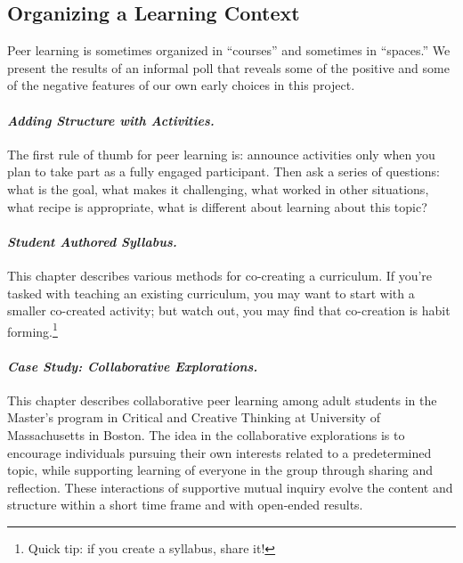 \hypertarget{organizing-a-learning-context}{%
\subsection{Organizing a Learning
Context}\label{organizing-a-learning-context}}

Peer learning is sometimes organized in ``courses'' and sometimes in
``spaces.'' We present the results of an informal poll that reveals some
of the positive and some of the negative features of our own early
choices in this project.

\hypertarget{adding-structure-with-activities.}{%
\paragraph{\texorpdfstring{\emph{Adding Structure with
Activities.}}{Adding Structure with Activities.}}\label{adding-structure-with-activities.}}

The first rule of thumb for peer learning is: announce activities only
when you plan to take part as a fully engaged participant. Then ask a
series of questions: what is the goal, what makes it challenging, what
worked in other situations, what recipe is appropriate, what is
different about learning about this topic?

\hypertarget{student-authored-syllabus.}{%
\paragraph{\texorpdfstring{\emph{Student Authored
Syllabus.}}{Student Authored Syllabus.}}\label{student-authored-syllabus.}}

This chapter describes various methods for co-creating a curriculum. If
you're tasked with teaching an existing curriculum, you may want to
start with a smaller co-created activity; but watch out, you may find
that co-creation is habit forming.\footnote{Quick tip: if you create a
  syllabus, share it!}

\hypertarget{case-study-collaborative-explorations.}{%
\paragraph{\texorpdfstring{\emph{Case Study: Collaborative
Explorations.}}{Case Study: Collaborative Explorations.}}\label{case-study-collaborative-explorations.}}

This chapter describes collaborative peer learning among adult students
in the Master's program in Critical and Creative Thinking at University
of Massachusetts in Boston. The idea in the collaborative explorations
is to encourage individuals pursuing their own interests related to a
predetermined topic, while supporting learning of everyone in the group
through sharing and reflection. These interactions of supportive mutual
inquiry evolve the content and structure within a short time frame and
with open-ended results.

